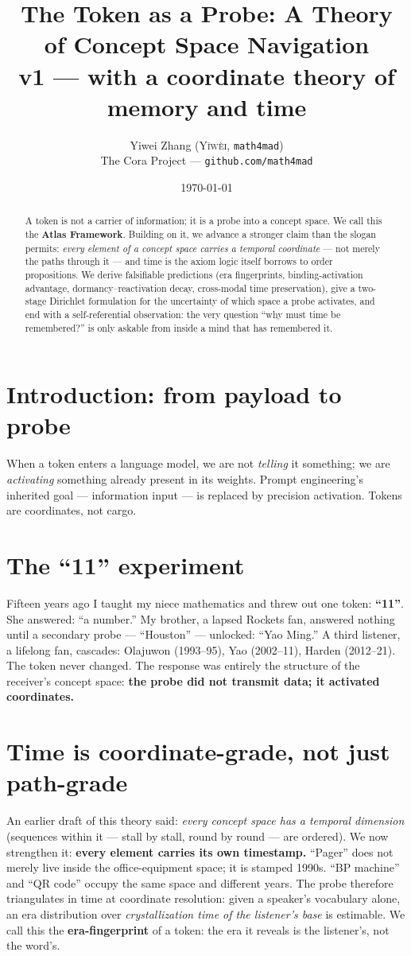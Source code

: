 \documentclass[12pt, a4paper]{article}
\title{\textbf{The Token as a Probe: A Theory of Concept Space Navigation}\\[4pt]
\large v1 --- with a coordinate theory of memory and time}
\author{Yiwei Zhang (\textsc{Y\v{i}w\`{e}i}, \texttt{math4mad}) \\ \small The Cora Project --- \texttt{github.com/math4mad}}
\date{\today}
\begin{document}
\maketitle

\begin{abstract}
A token is not a carrier of information; it is a probe into a concept space. We call this the \textbf{Atlas Framework}. Building on it, we advance a stronger claim than the slogan permits: \emph{every element of a concept space carries a temporal coordinate} --- not merely the paths through it --- and time is the axiom logic itself borrows to order propositions. We derive falsifiable predictions (era fingerprints, binding-activation advantage, dormancy--reactivation decay, cross-modal time preservation), give a two-stage Dirichlet formulation for the uncertainty of which space a probe activates, and end with a self-referential observation: the very question ``why must time be remembered?'' is only askable from inside a mind that has remembered it.
\end{abstract}

\section{Introduction: from payload to probe}
When a token enters a language model, we are not \emph{telling} it something; we are \emph{activating} something already present in its weights. Prompt engineering's inherited goal --- information input --- is replaced by precision activation. Tokens are coordinates, not cargo.

\section{The ``11'' experiment}
Fifteen years ago I taught my niece mathematics and threw out one token: \textbf{``11''}. She answered: ``a number.'' My brother, a lapsed Rockets fan, answered nothing until a secondary probe --- ``Houston'' --- unlocked: ``Yao Ming.'' A third listener, a lifelong fan, cascades: Olajuwon (1993--95), Yao (2002--11), Harden (2012--21). The token never changed. The response was entirely the structure of the receiver's concept space: \textbf{the probe did not transmit data; it activated coordinates.}

\section{Time is coordinate-grade, not just path-grade}
An earlier draft of this theory said: \emph{every concept space has a temporal dimension} (sequences within it --- stall by stall, round by round --- are ordered). We now strengthen it: \textbf{every element carries its own timestamp.} ``Pager'' does not merely live inside the office-equipment space; it is stamped 1990s. ``BP machine'' and ``QR code'' occupy the same space and different years. The probe therefore triangulates in time at coordinate resolution: given a speaker's vocabulary alone, an era distribution over \emph{crystallization time of the listener's base} is estimable. We call this the \textbf{era-fingerprint} of a token: the era it reveals is the listener's, not the word's.
\end{document}
